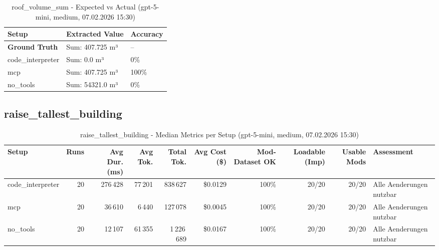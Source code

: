 \documentclass[a4paper,11pt]{article}
\begin{document}
\begin{table}[H]
\centering
\scriptsize
\caption{roof\_volume\_sum - Expected vs Actual (gpt-5-mini, medium, 07.02.2026 15:30)}
\begin{tabular}{l l l}
\toprule
Setup & Extracted Value & Accuracy \\
\midrule
\textbf{Ground Truth} & Sum: 407.725 m³ & -- \\
\midrule
code\_interpreter & Sum: 0.0 m³ & 0\% \\
mcp & Sum: 407.725 m³ & 100\% \\
no\_tools & Sum: 54321.0 m³ & 0\% \\
\bottomrule
\end{tabular}
\end{table}

\clearpage

\subsection{raise\_tallest\_building}

\begin{table}[H]
\centering
\scriptsize
\caption{raise\_tallest\_building - Median Metrics per Setup (gpt-5-mini, medium, 07.02.2026 15:30)}
\label{tab:combined\_raise\_tallest\_building\_metrics\_20260207}
\begin{tabular}{l r r r r r r r r l}
\toprule
Setup & Runs & Avg Dur. (ms) & Avg Tok. & Total Tok. & Avg Cost (\$) & Mod-Dataset OK & Loadable (Imp) & Usable Mods & Assessment \\
\midrule
code\_interpreter & 20 & 276\,428 & 77\,201 & 838\,627 & \$0.0129 & 100\% & 20/20 & 20/20 & Alle Aenderungen nutzbar \\
mcp & 20 & 36\,610 & 6\,440 & 127\,078 & \$0.0045 & 100\% & 20/20 & 20/20 & Alle Aenderungen nutzbar \\
no\_tools & 20 & 12\,107 & 61\,355 & 1\,226\,689 & \$0.0167 & 100\% & 20/20 & 20/20 & Alle Aenderungen nutzbar \\
\bottomrule
\end{tabular}
\end{table}
\end{document}
